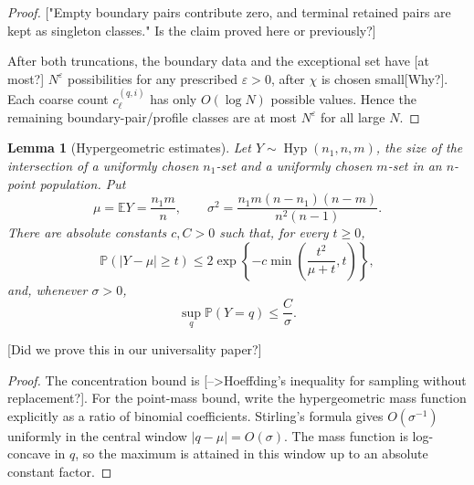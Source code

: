 \documentclass[11pt]{article}
\newtheorem{lem}{Lemma}
\newcommand{\E}{\mathbb E}
\newcommand{\Pbb}{\mathbb P}
\newcommand{\jscomment}[1]{\textup{\textsf{\color{blue}[#1]}}}
\begin{document}
\begin{proof}
\jscomment{"Empty boundary pairs contribute zero, and terminal retained pairs are kept as singleton classes." Is the claim proved here or previously?}

After both truncations, the boundary data and the exceptional set have
\jscomment{at most?} \(N^\varepsilon\) possibilities for any prescribed \(\varepsilon>0\),
after \(\chi\) is chosen small\jscomment{Why?}. Each coarse count
\(c_\ell^{(q,i)}\) has only \(O(\log N)\) possible values. Hence the
remaining boundary-pair/profile classes are at most \(N^\varepsilon\)
for all large \(N\).

\end{proof}

\begin{lem}[Hypergeometric estimates]\label{lem:hypergeo-input}
Let \(Y\sim\operatorname{Hyp}(n_1,n,m)\), the size of the intersection
of a uniformly chosen \(n_1\)-set and a uniformly chosen \(m\)-set in an
\(n\)-point population. Put
\[
    \mu=\E Y=\frac{n_1m}{n},
    \qquad
    \sigma^2=
    \frac{n_1m(n-n_1)(n-m)}{n^2(n-1)} .
\]
There are absolute constants \(c,C>0\) such that, for every \(t\ge0\),
\[
    \Pbb(|Y-\mu|\ge t)
    \le
    2\exp\left\{-c\min\left(\frac{t^2}{\mu+t},t\right)\right\},
\]
and, whenever \(\sigma>0\),
\[
    \sup_q \Pbb(Y=q)\le \frac{C}{\sigma}.
\]
\end{lem}

\jscomment{Did we prove this in our universality paper?}

\begin{proof}
The concentration bound is \jscomment{-->Hoeffding's inequality for sampling without
replacement?}. For the point-mass bound, write the hypergeometric mass
function explicitly as a ratio of binomial coefficients. Stirling's
formula gives \(O(\sigma^{-1})\) uniformly in the central window
\(|q-\mu|=O(\sigma)\). The mass function is log-concave in \(q\), so the
maximum is attained in this window up to an absolute constant factor.
\end{proof}
\end{document}
